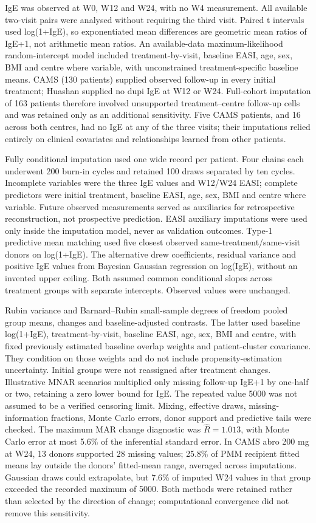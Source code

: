 IgE was observed at W0, W12 and W24, with no W4 measurement. All available two-visit pairs were analysed without requiring the third visit. Paired t intervals used log(1+IgE), so exponentiated mean differences are geometric mean ratios of IgE+1, not arithmetic mean ratios. An available-data maximum-likelihood random-intercept model included treatment-by-visit, baseline EASI, age, sex, BMI and centre where variable, with unconstrained treatment-specific baseline means. CAMS (130 patients) supplied observed follow-up in every initial treatment; Huashan supplied no dupi IgE at W12 or W24. Full-cohort imputation of 163 patients therefore involved unsupported treatment--centre follow-up cells and was retained only as an additional sensitivity. Five CAMS patients, and 16 across both centres, had no IgE at any of the three visits; their imputations relied entirely on clinical covariates and relationships learned from other patients.

Fully conditional imputation used one wide record per patient. Four chains each underwent 200 burn-in cycles and retained 100 draws separated by ten cycles. Incomplete variables were the three IgE values and W12/W24 EASI; complete predictors were initial treatment, baseline EASI, age, sex, BMI and centre where variable. Future observed measurements served as auxiliaries for retrospective reconstruction, not prospective prediction. EASI auxiliary imputations were used only inside the imputation model, never as validation outcomes. Type-1 predictive mean matching used five closest observed same-treatment/same-visit donors on log(1+IgE). The alternative drew coefficients, residual variance and positive IgE values from Bayesian Gaussian regression on log(IgE), without an invented upper ceiling. Both assumed common conditional slopes across treatment groups with separate intercepts. Observed values were unchanged.

Rubin variance and Barnard--Rubin small-sample degrees of freedom pooled group means, changes and baseline-adjusted contrasts. The latter used baseline log(1+IgE), treatment-by-visit, baseline EASI, age, sex, BMI and centre, with fixed previously estimated baseline overlap weights and patient-cluster covariance. They condition on those weights and do not include propensity-estimation uncertainty. Initial groups were not reassigned after treatment changes. Illustrative MNAR scenarios multiplied only missing follow-up IgE+1 by one-half or two, retaining a zero lower bound for IgE. The repeated value 5000 was not assumed to be a verified censoring limit. Mixing, effective draws, missing-information fractions, Monte Carlo errors, donor support and predictive tails were checked. The maximum MAR change diagnostic was $\widehat R=1.013$, with Monte Carlo error at most 5.6\% of the inferential standard error. In CAMS abro 200 mg at W24, 13 donors supported 28 missing values; 25.8\% of PMM recipient fitted means lay outside the donors' fitted-mean range, averaged across imputations. Gaussian draws could extrapolate, but 7.6\% of imputed W24 values in that group exceeded the recorded maximum of 5000. Both methods were retained rather than selected by the direction of change; computational convergence did not remove this sensitivity.\citep{sterne2009mi,wijesuriya2025longitudinal}

